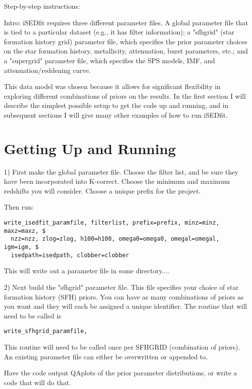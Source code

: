 \documentclass[12pt,preprint]{aastex}
\begin{document}
Step-by-step instructions:

Intro: iSEDfit requires three different parameter files.  A global
parameter file that is tied to a particular dataset (e.g., it has
filter information); a "sfhgrid" (star formation history grid)
parameter file, which specifies the prior parameter choices on the
star formation history, metallicity, attenuation, burst parameters,
etc.; and a "supergrid" parameter file, which specifies the SPS
models, IMF, and attenuation/reddening curve.

This data model was chosen because it allows for significant
flexibility in exploring different combinations of priors on the
results.  In the first section I will describe the simplest possible
setup to get the code up and running, and in subsequent sections I
will give many other examples of how to run iSEDfit.

\section{Getting Up and Running}

1) First make the global parameter file.  Choose the filter list, and
be sure they have been incorporated into K-correct.  Choose the
minimum and maximum redshifts you will consider.  Choose a unique
prefix for the project.

Then run: 

\begin{verbatim}
write_isedfit_paramfile, filterlist, prefix=prefix, minz=minz, maxz=maxz, $
  nzz=nzz, zlog=zlog, h100=h100, omega0=omega0, omegal=omegal, igm=igm, $
  isedpath=isedpath, clobber=clobber
\end{verbatim}

This will write out a parameter file in some directory....

2) Next build the "sfhgrid" parameter file.  This file specifies your
choice of star formation history (SFH) priors.  You can have as many
combinations of priors as you want and they will each be assigned a
unique identifier.  The routine that will need to be called is

\begin{verbatim}
write_sfhgrid_paramfile, 
\end{verbatim}


This routine will need to be called once per SFHGRID (combination of
priors).  An existing parameter file can either be overwritten or
appended to.
  

Have the code output QAplots of the prior parameter distributions, or
write a code that will do that.
\end{document}
